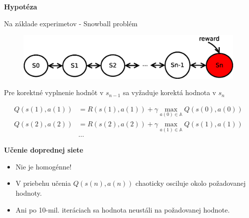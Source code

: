 \documentclass[xcolor=dvipsnames]{beamer}
\begin{document}
\begin{frame}{\bf Hypotéza}

Na základe experimetov - Snowball problém

\begin{figure}[!htb]
\includegraphics[scale=.5]{../diagrams/q_chain_problem.eps}
\end{figure}

Pre korektné vyplnenie hodnôt v $s_{n-1}$ sa vyžaduje korektá hodnota v $s_{n}$

\begin{align*}
    Q(s(1),a(1)) &= R(s(1),a(1)) + \gamma \max_{a(0) \in \mathbb{A}} Q(s(0), a(0)) \\
    Q(s(2),a(2)) &= R(s(2),a(2)) + \gamma \max_{a(1) \in \mathbb{A}} Q(s(1), a(1)) \\
    & \dots
\end{align*}

\end{frame}



\begin{frame}{\bf Učenie doprednej siete}

\begin{itemize}
 \item Nie je homogénne! \\
 \item V priebehu učenia $Q(s(n),a(n))$ chaoticky osciluje okolo požadovanej hodnoty. \\
 \item Ani po 10-mil. iteráciach sa hodnota neustáli na požadovanej hodnote.
\end{itemize}

\end{frame}
\end{document}
